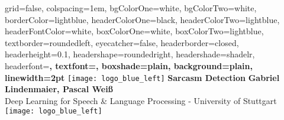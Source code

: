 \documentclass[portrait,final,a0paper,fontscale=0.27]{baposter}
\begin{document}



\begin{poster}%
  {
  grid=false,
  colspacing=1em,
  bgColorOne=white,
  bgColorTwo=white,
  borderColor=lightblue,
  headerColorOne=black,
  headerColorTwo=lightblue,
  headerFontColor=white,
  boxColorOne=white,
  boxColorTwo=lightblue,
  textborder=roundedleft,
  eyecatcher=false,
  headerborder=closed,
  headerheight=0.1\textheight,
  headershape=roundedright,
  headershade=shadelr,
  headerfont=\Large\bf\textsc, %
  textfont={\setlength{\parindent}{1.3em}},
  boxshade=plain,
  background=plain,
  linewidth=2pt
  }
  {\texttt{[image: logo\_blue\_left]}} 
  {\bf \huge Sarcasm Detection \vspace{0.5em}}
  {{\bf Gabriel Lindenmaier, Pascal Weiß} \\ 
  Deep Learning for Speech \& Language Processing - University of Stuttgart}
  {%
  	\centering
    \texttt{[image: logo\_blue\_left]}
  }

    \newcommand{\colouredcircle}{%
      \tikz{\useasboundingbox (-0.2em,-0.32em) rectangle(0.2em,0.32em); \draw[draw=black,fill=lightblue,line width=0.03em] (0,0) circle(0.18em);}}


\end{poster}
\end{document}
